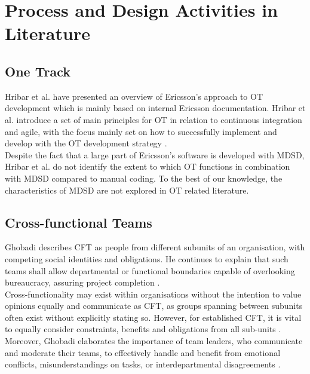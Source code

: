 \documentclass[fina_report_innit.tex]{subfiles}
\begin{document}
\section{Process and Design Activities in Literature}


\subsection{One Track}
Hribar et al. \cite{hribar2008first} have presented an overview of Ericsson's approach to OT development which is mainly based on internal Ericsson documentation. Hribar et al. introduce a set of main principles for OT in relation to continuous integration and agile, with the focus mainly set on how to successfully implement and develop with the OT development strategy \cite{hribar2008first}.
\\

Despite the fact that a large part of Ericsson's software is developed with MDSD, Hribar et al. do not identify the extent to which OT functions in combination with MDSD compared to manual coding. To the best of our knowledge, the characteristics of MDSD are not explored in OT related literature.

\subsection{Cross-functional Teams}
Ghobadi describes CFT as people from different subunits of an organisation, with competing social identities and obligations. He continues to explain that such teams shall allow departmental or functional boundaries capable of overlooking bureaucracy, assuring project completion \cite{ghobadi2011challenges}.
\\

Cross-functionality may exist within organisations without the intention to value opinions equally and communicate as CFT, as groups spanning between subunits often exist without explicitly stating so. However, for established CFT, it is vital to equally consider constraints, benefits and obligations from all sub-units \cite{ghobadi2011challenges}.
\\

Moreover, Ghobadi elaborates the importance of team leaders, who communicate and moderate their teams, to effectively handle and benefit from emotional conflicts, misunderstandings on tasks, or interdepartmental disagreements \cite{ghobadi2011challenges}.
\\
\end{document}
